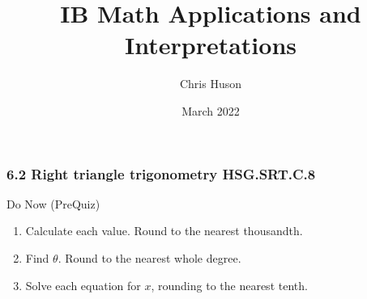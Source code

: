 \documentclass[12pt, twoside]{article}
\title{IB Math Applications and Interpretations}
\author{Chris Huson}
\date{March 2022}
\begin{document}
\subsubsection*{6.2 Right triangle trigonometry \hfill HSG.SRT.C.8}
Do Now (PreQuiz)
\begin{enumerate}
\item Calculate each value. Round to the nearest thousandth.
  \begin{enumerate}
  \end{enumerate}
  \vspace{1cm}

\item Find $\theta$. Round to the nearest whole degree.
  \begin{enumerate}
  \end{enumerate} \vspace{2cm}

\item Solve each equation for $x$, rounding to the nearest tenth.
  \begin{enumerate}
  \end{enumerate}
  \vspace{3cm}


\end{enumerate}
\end{document}
